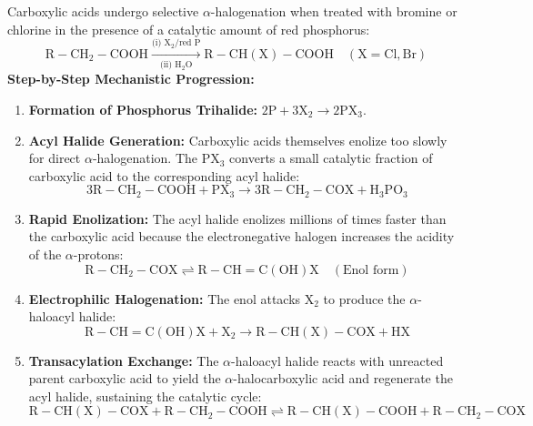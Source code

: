 \documentclass[10pt,a4paper]{article}
\begin{document}
\begin{conceptbox}
Carboxylic acids undergo selective $\alpha$-halogenation when treated with bromine or chlorine in the presence of a catalytic amount of red phosphorus:
\begin{equation}
  \mathrm{R-CH_2-COOH} \xrightarrow[\text{(ii) } \mathrm{H_2O}]{\text{(i) } \mathrm{X_2} / \text{red P}} \mathrm{R-CH(X)-COOH} \quad (\mathrm{X = Cl, Br})
\end{equation}
\textbf{Step-by-Step Mechanistic Progression:}
\begin{enumerate}[leftmargin=*]
  \item \textbf{Formation of Phosphorus Trihalide:} $2\mathrm{P} + 3\mathrm{X_2} \to 2\mathrm{PX_3}$.
  \item \textbf{Acyl Halide Generation:} Carboxylic acids themselves enolize too slowly for direct $\alpha$-halogenation. The $\mathrm{PX_3}$ converts a small catalytic fraction of carboxylic acid to the corresponding acyl halide:
  \begin{equation}
    3\mathrm{R-CH_2-COOH} + \mathrm{PX_3} \to 3\mathrm{R-CH_2-COX} + \mathrm{H_3PO_3}
  \end{equation}
  \item \textbf{Rapid Enolization:} The acyl halide enolizes millions of times faster than the carboxylic acid because the electronegative halogen increases the acidity of the $\alpha$-protons:
  \begin{equation}
    \mathrm{R-CH_2-COX} \rightleftharpoons \mathrm{R-CH=C(OH)X} \quad (\text{Enol form})
  \end{equation}
  \item \textbf{Electrophilic Halogenation:} The enol attacks $\mathrm{X_2}$ to produce the $\alpha$-haloacyl halide:
  \begin{equation}
    \mathrm{R-CH=C(OH)X} + \mathrm{X_2} \to \mathrm{R-CH(X)-COX} + \mathrm{HX}
  \end{equation}
  \item \textbf{Transacylation Exchange:} The $\alpha$-haloacyl halide reacts with unreacted parent carboxylic acid to yield the $\alpha$-halocarboxylic acid and regenerate the acyl halide, sustaining the catalytic cycle:
  \begin{equation}
    \mathrm{R-CH(X)-COX} + \mathrm{R-CH_2-COOH} \rightleftharpoons \mathrm{R-CH(X)-COOH} + \mathrm{R-CH_2-COX}
  \end{equation}
\end{enumerate}
\end{conceptbox}
\end{document}
